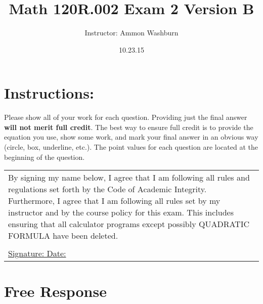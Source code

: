 \documentclass[fleqn]{article}
\renewcommand{\thispagestyle}[1]{}
\begin{document}
\title{Math 120R.002 Exam 2 Version B}
\date{10.23.15}
\author{Instructor: Ammon Washburn}
\maketitle

\section*{Instructions:} 
Please show all of your work for each question. Providing just the final answer \textbf{will not merit full credit}. The best way to ensure full credit is to provide the equation you use, show some work, and mark your final answer in an obvious way (circle, box, underline, etc.). The point values for each question are located at the beginning of the question.

\vspace{1in} 

\begin{tabular}{|p{6.5in}|} 
\hline 
\noindent By signing my name below, I agree that I am following all rules and regulations set forth by the Code of Academic Integrity.  Furthermore, I agree that I am following all rules set by my instructor and by the course policy for this exam.  This includes ensuring that all calculator programs except possibly QUADRATIC FORMULA have been deleted.\\
\vspace{.3 in}\\
\underline{Signature:	\hspace{2.5 in}	Date:\hspace{1.25 in}}\\
\hline 
\end{tabular} 

\pagebreak
\thispagestyle{fancy}{
\lhead{}
}



\section*{Free Response}
\end{document}
